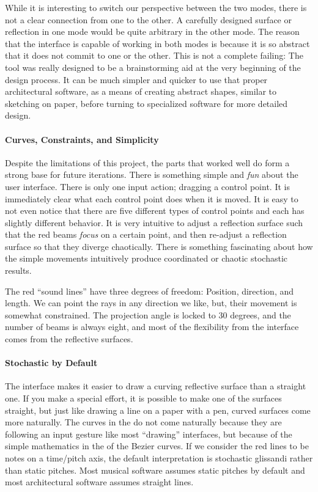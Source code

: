 While it is interesting to switch our perspective between the two
modes, there is not a clear connection from one to the other. A
carefully designed surface or reflection in one mode would be quite
arbitrary in the other mode. The reason that the interface is capable
of working in both modes is because it is so abstract that it does
not commit to one or the other. This is not a complete failing: The
tool was really designed to be a brainstorming aid at the very
beginning of the design process. It can be much simpler and quicker to
use that proper architectural software, as a means of creating
abstract shapes, similar to sketching on paper, before turning to
specialized software for more detailed design.

\paragraph{Curves, Constraints, and Simplicity} Despite the
limitations of this project, the parts that worked well do form a
strong base for future iterations. There is something simple and
\textit{fun} about the user interface. There is only one input action;
dragging a control point. It is immediately clear what each control
point does when it is moved. It is easy to not even notice that there
are five different types of control points and each has slightly
different behavior. It is very intuitive to adjust a reflection
surface such that the red beams \textit{focus} on a certain point, and
then re-adjust a reflection surface so that they diverge
chaotically. There is something fascinating about how the simple
movements intuitively produce coordinated or chaotic stochastic
results.

The red ``sound lines'' have three degrees of freedom: Position,
direction, and length. We can point the rays in any direction we like,
but, their movement is somewhat constrained.  The projection angle is
locked to 30 degrees, and the number of beams is always eight, and
most of the flexibility from the interface comes from the reflective
surfaces.

\paragraph{Stochastic by Default} The  interface makes it easier
to draw a curving reflective surface than a straight one. If you make
a special effort, it is possible to make one of the surfaces straight,
but just like drawing a line on a paper with a pen, curved surfaces
come more naturally. The curves in the  do not come naturally
because they are following an input gesture like most ``drawing''
interfaces, but because of the simple mathematics in the of the Bezier
curves. If we consider the red lines to be notes on a time/pitch axis,
the default interpretation is stochastic glissandi rather than static
pitches. Most musical software assumes static pitches by default and
most architectural software assumes straight lines.

